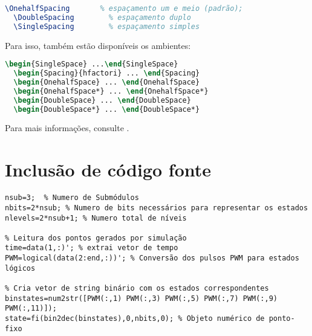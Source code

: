 \begin{lstlisting}[language=tex]
  \OnehalfSpacing       % espaçamento um e meio (padrão);
  \DoubleSpacing        % espaçamento duplo
  \SingleSpacing        % espaçamento simples
\end{lstlisting}

Para isso, também estão disponíveis os ambientes:

\begin{lstlisting}[language=tex]
  \begin{SingleSpace} ...\end{SingleSpace}
  \begin{Spacing}{hfactori} ... \end{Spacing}
  \begin{OnehalfSpace} ... \end{OnehalfSpace}
  \begin{OnehalfSpace*} ... \end{OnehalfSpace*}
  \begin{DoubleSpace} ... \end{DoubleSpace}
  \begin{DoubleSpace*} ... \end{DoubleSpace*}
\end{lstlisting}

Para mais informações, consulte .

\section{Inclusão de código fonte}\label{sec-codeinsert}

\begin{lstlisting}[caption={Leitura dos dados simulados e conversão para estados topológicos.},label={lst:leituradadossim}]
% Pré definições iniciais
nsub=3;  % Numero de Submódulos
nbits=2*nsub; % Numero de bits necessários para representar os estados
nlevels=2*nsub+1; % Numero total de níveis

% Leitura dos pontos gerados por simulação
time=data(1,:)'; % extrai vetor de tempo
PWM=logical(data(2:end,:))'; % Conversão dos pulsos PWM para estados lógicos

% Cria vetor de string binário com os estados correspondentes
binstates=num2str([PWM(:,1) PWM(:,3) PWM(:,5) PWM(:,7) PWM(:,9) PWM(:,11)]);
state=fi(bin2dec(binstates),0,nbits,0); % Objeto numérico de ponto-fixo

\end{lstlisting}



